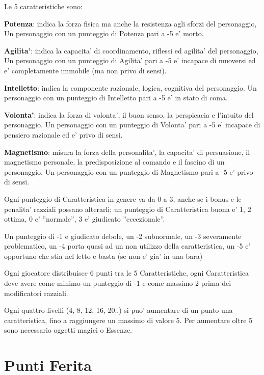 \documentclass[a4paper,11pt,twoside,openany]{book}
\begin{document}
Le 5 caratteristiche sono:

\textbf{Potenza}: indica la forza fisica ma anche la resistenza agli sforzi del personaggio, Un personaggio con un punteggio di Potenza pari a -5 e' morto.

\textbf{Agilita'}: indica la capacita' di coordinamento, riflessi ed agilita' del personaggio, Un personaggio con un punteggio di Agilita' pari a -5 e' incapace di muoversi ed e' completamente immobile (ma non privo di sensi).

\textbf{Intelletto}: indica la componente razionale, logica, cognitiva del personaggio. Un personaggio con un punteggio di Intelletto pari a -5 e' in stato di coma.

\textbf{Volonta'}: indica la forza di volonta', il buon senso, la perspicacia e l'intuito del personaggio. Un personaggio con un punteggio di Volonta' pari a -5 e' incapace di pensiero razionale ed e' privo di sensi.

\textbf{Magnetismo}: misura la forza della personalita', la capacita' di persuasione, il magnetismo personale, la predisposizione al comando e il fascino di un personaggio. Un personaggio con un punteggio di Magnetismo pari a -5 e' privo di sensi.

\smallskip

Ogni punteggio di Caratteristica in genere va da 0 a 3, anche se i bonus e le penalita' razziali possano alterarli; un punteggio di Caratteristica buona e' 1, 2 ottima, 0 e' ''normale'', 3 e' giudicato ''eccezionale''.

Un punteggio di -1 e giudicato debole, un -2 subnormale, un -3 severamente problematico, un -4 porta quasi ad un non utilizzo della caratteristica, un -5 e' opportuno che stia nel letto e basta (se non e' gia' in una bara)

Ogni giocatore distribuisce 6 punti tra le 5 Caratteristiche, ogni Caratteristica deve avere come minimo un punteggio di -1 e come massimo 2 prima dei modificatori razziali.

Ogni quattro livelli (4, 8, 12, 16, 20..) si puo' aumentare di un punto una caratteristica, fino a raggiungere un massimo di valore 5. Per aumentare oltre 5 sono necessario oggetti magici o Essenze.


\section{Punti Ferita}
\end{document}
